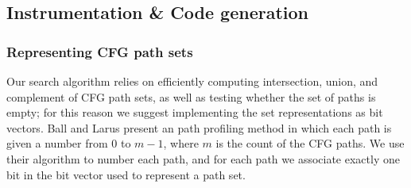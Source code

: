 \documentclass[12pt]{gatech-thesis}
\begin{document}

\subsection{Instrumentation \& Code generation}

\subsubsection{Representing CFG path sets}

Our search algorithm relies on efficiently computing intersection, union, and complement of CFG path sets, as well as testing whether the set of paths is empty; for this reason we suggest implementing the set representations as bit vectors. 
Ball and Larus \cite{Ball1996} present an path profiling method in which each path is given a number from 0 to $m-1$, where $m$ is the count of the CFG paths. 
We use their algorithm to number each path, and for each path we associate exactly one bit in the bit vector used to represent a path set.
\end{document}
